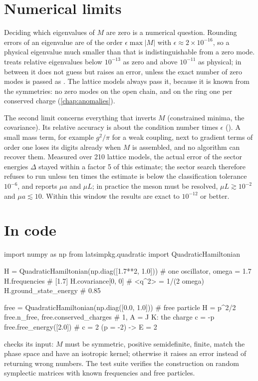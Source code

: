 \section{Numerical limits}\label{sec:numerics}
Deciding which eigenvalues of $M$ are zero is a numerical question. Rounding errors of an eigenvalue are of the
order $\epsilon\max|M|$ with $\epsilon\approx2\times10^{-16}$, so a physical eigenvalue much smaller than that is
indistinguishable from a zero mode.  treats relative eigenvalues below $10^{-13}$ as zero
and above $10^{-11}$ as physical; in between it does not guess but raises an error, unless the exact number of zero
modes is passed as . The lattice models always pass it, because it is known from the symmetries: no zero
modes on the open chain, and on the ring one per conserved charge (\cref{chap:anomalies}).

The second limit concerns everything that inverts $M$ (constrained minima, the covariance). Its relative accuracy
is about the condition number times $\epsilon$ (). A small mass term, for
example $g^2/\pi$ for a weak coupling, next to gradient terms of order one loses its digits already when $M$ is
assembled, and no algorithm can recover them. Measured over 210 lattice models, the actual error of the sector
energies $\Delta$ stayed within a factor 5 of this estimate; the sector search therefore refuses to run unless ten
times the estimate is below the classification tolerance $10^{-6}$, and reports $\mu a$ and $\mu L$; in practice the meson must be resolved,
$\mu L\gtrsim10^{-2}$ and $\mu a\lesssim10$. Within this window the results are exact to $10^{-12}$ or better.

\section{In code}
\begin{python}
import numpy as np
from latsimpkg.quadratic import QuadraticHamiltonian

H = QuadraticHamiltonian(np.diag([1.7**2, 1.0]))   # one oscillator, omega = 1.7
H.frequencies             # [1.7]
H.covariance[0, 0]        # <q^2> = 1/(2 omega)
H.ground_state_energy     # 0.85

free = QuadraticHamiltonian(np.diag([0.0, 1.0]))   # free particle H = p^2/2
free.n_free, free.conserved_charges               # 1, A = J K: the charge c = -p
free.free_energy([2.0])                            # c = 2 (p = -2)  ->  E = 2
\end{python}
 checks its input: $M$ must be symmetric, positive semidefinite, finite, match the
phase space and have an isotropic kernel; otherwise it raises an error instead of returning wrong numbers. The
test suite verifies the construction on random symplectic matrices with known frequencies and free particles.
